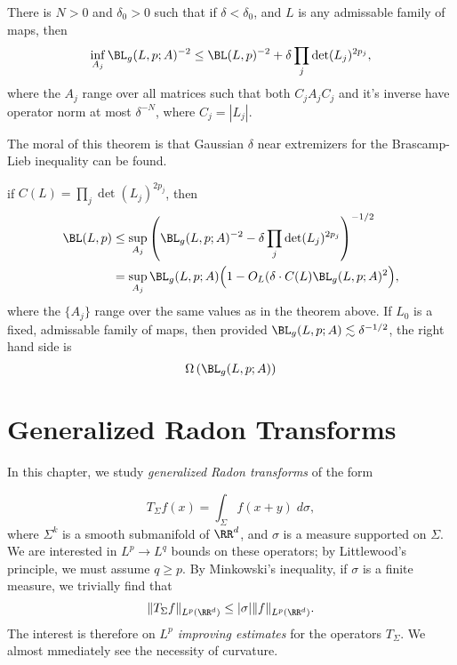 \begin{theorem}
    There is $N > 0$ and $\delta_0 > 0$ such that if $\delta < \delta_0$, and $L$ is any admissable family of maps, then
    \[ \inf_{A_j} \BL_g(L,p;A)^{-2} \leq \BL(L,p)^{-2} + \delta \prod_j \det(L_j)^{2 p_j}, \]
    where the $A_j$ range over all matrices such that both $C_j A_j C_j$ and it's inverse have operator norm at most $\delta^{-N}$, where $C_j = |L_j|$.
\end{theorem}

The moral of this theorem is that Gaussian $\delta$ near extremizers for the Brascamp-Lieb inequality can be found.


 if $C(L) = \prod_j \det(L_j)^{2p_j}$, then
%
\begin{align*}
    \BL(L,p) &\leq \sup_{A_j} \left( \BL_g(L,p;A)^{-2} - \delta \prod_j \det(L_j)^{2p_j} \right)^{-1/2}\\
    &= \sup_{A_j} \BL_g(L,p;A) \Big( 1 - O_L( \delta \cdot C(L) \BL_g(L,p;A)^2 \Big),
\end{align*}
%
where the $\{ A_j \}$ range over the same values as in the theorem above. If $L_0$ is a fixed, admissable family of maps, then provided $\BL_g(L,p;A) \lesssim \delta^{-1/2}$, the right hand side is
%
\[ \Omega \left( \BL_g(L,p;A) \right) \]
















\chapter{Generalized Radon Transforms}

In this chapter, we study \emph{generalized Radon transforms} of the form

\[ T_\Sigma f(x) = \int_\Sigma f(x + y)\; d\sigma, \]
%
where $\Sigma^k$ is a smooth submanifold of $\RR^d$, and $\sigma$ is a measure supported on $\Sigma$. We are interested in $L^p \to L^q$ bounds on these operators; by Littlewood's principle, we must assume $q \geq p$. By Minkowski's inequality, if $\sigma$ is a finite measure, we trivially find that
%
\[\| T_\Sigma f \|_{L^p(\RR^d)} \leq |\sigma| \| f \|_{L^p(\RR^d)}. \]
%
The interest is therefore on \emph{$L^p$ improving estimates} for the operators $T_\Sigma$. We almost mmediately see the necessity of curvature.

